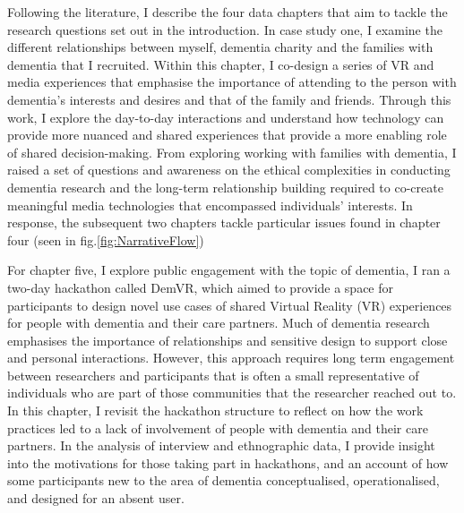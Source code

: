 Following the literature, I describe the four data chapters that aim to tackle the research questions set out in the introduction. In case study one, I examine the different relationships between myself, dementia charity and the families with dementia that I recruited. Within this chapter, I co-design a series of VR and media experiences that emphasise the importance of attending to the person with dementia's interests and desires and that of the family and friends. Through this work, I explore the day-to-day interactions and understand how technology can provide more nuanced and shared experiences that provide a more enabling role of shared decision-making. From exploring working with families with dementia, I raised a set of questions and awareness on the ethical complexities in conducting dementia research and the long-term relationship building required to co-create meaningful media technologies that encompassed individuals' interests. In response, the subsequent two chapters tackle particular issues found in chapter four (seen in fig.\ref{fig:NarrativeFlow})

For chapter five, I explore public engagement with the topic of dementia, I ran a two-day hackathon called DemVR, which aimed to provide a space for participants to design novel use cases of shared Virtual Reality (VR) experiences for people with dementia and their care partners. Much of dementia research emphasises the importance of relationships and sensitive design to support close and personal interactions. However, this approach requires long term engagement between researchers and participants that is often a small representative of individuals who are part of those communities that the researcher reached out to. In this chapter, I revisit the hackathon structure to reflect on how the work practices led to a lack of involvement of people with dementia and their care partners. In the analysis of interview and ethnographic data, I provide insight into the motivations for those taking part in hackathons, and an account of how some participants new to the area of dementia conceptualised, operationalised, and designed for an absent user. 

